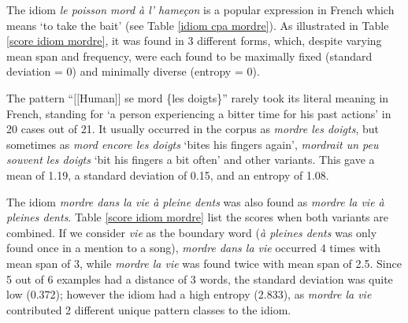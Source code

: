 \documentclass[output=paper]{langsci/langscibook}
\begin{document}
The idiom \textit{le poisson mord à l' hameçon} is a popular expression in
French which means `to take the bait' (see Table \ref{idiom cpa mordre}). As illustrated in
Table \ref{score idiom mordre}, it was found in 3 different forms, which, despite varying mean
span and frequency, were each found to be maximally fixed (standard
deviation = 0) and minimally diverse (entropy = 0).



The pattern “$[$$[$Human$]$$]$ se mord \{les doigts\}” rarely took its literal
meaning in French, standing for `a person experiencing a bitter time
for his past actions' in 20 cases out of 21. It usually occurred in the
corpus as \textit{mordre les doigts}, but sometimes as \textit{mord encore les
doigts} `bites his fingers again', \textit{mordrait un peu souvent les
doigts} `bit his fingers a bit often' and other variants. This gave a
mean of 1.19, a standard deviation of 0.15, and an entropy of 1.08.



The idiom \textit{mordre dans la vie à pleine dents} was also found as \textit{mordre
la vie à pleines dents}. Table \ref{score idiom mordre} list the scores when both variants are
combined. If we consider \textit{vie} as the boundary word (\textit{à pleines dents}
was only found once in a mention to a song), \textit{mordre dans la vie}
occurred 4 times with mean span of 3, while \textit{mordre la vie} was found
twice with mean span of 2.5. Since 5 out of 6 examples had a distance
of 3 words, the standard deviation was quite low (0.372); however the
idiom had a high entropy (2.833), as \textit{mordre la vie} contributed 2
different unique pattern classes to the idiom. 
\end{document}
